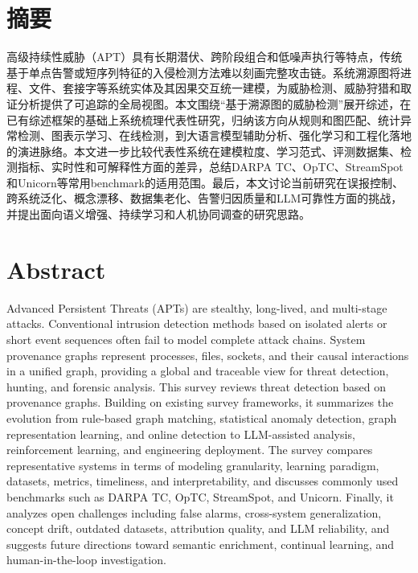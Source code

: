 \maketitle%
\MAKETITLE%
\makedeclaration%
\intobmk\chapter*{摘\quad 要}%
\setcounter{page}{1}%

高级持续性威胁（APT）具有长期潜伏、跨阶段组合和低噪声执行等特点，传统基于单点告警或短序列特征的入侵检测方法难以刻画完整攻击链。系统溯源图将进程、文件、套接字等系统实体及其因果交互统一建模，为威胁检测、威胁狩猎和取证分析提供了可追踪的全局视图。本文围绕“基于溯源图的威胁检测”展开综述，在已有综述框架的基础上系统梳理代表性研究，归纳该方向从规则和图匹配、统计异常检测、图表示学习、在线检测，到大语言模型辅助分析、强化学习和工程化落地的演进脉络。本文进一步比较代表性系统在建模粒度、学习范式、评测数据集、检测指标、实时性和可解释性方面的差异，总结DARPA TC、OpTC、StreamSpot和Unicorn等常用benchmark的适用范围。最后，本文讨论当前研究在误报控制、跨系统泛化、概念漂移、数据集老化、告警归因质量和LLM可靠性方面的挑战，并提出面向语义增强、持续学习和人机协同调查的研究思路。

\intobmk\chapter*{Abstract}%

Advanced Persistent Threats (APTs) are stealthy, long-lived, and multi-stage attacks. Conventional intrusion detection methods based on isolated alerts or short event sequences often fail to model complete attack chains. System provenance graphs represent processes, files, sockets, and their causal interactions in a unified graph, providing a global and traceable view for threat detection, hunting, and forensic analysis. This survey reviews threat detection based on provenance graphs. Building on existing survey frameworks, it summarizes the evolution from rule-based graph matching, statistical anomaly detection, graph representation learning, and online detection to LLM-assisted analysis, reinforcement learning, and engineering deployment. The survey compares representative systems in terms of modeling granularity, learning paradigm, datasets, metrics, timeliness, and interpretability, and discusses commonly used benchmarks such as DARPA TC, OpTC, StreamSpot, and Unicorn. Finally, it analyzes open challenges including false alarms, cross-system generalization, concept drift, outdated datasets, attribution quality, and LLM reliability, and suggests future directions toward semantic enrichment, continual learning, and human-in-the-loop investigation.

